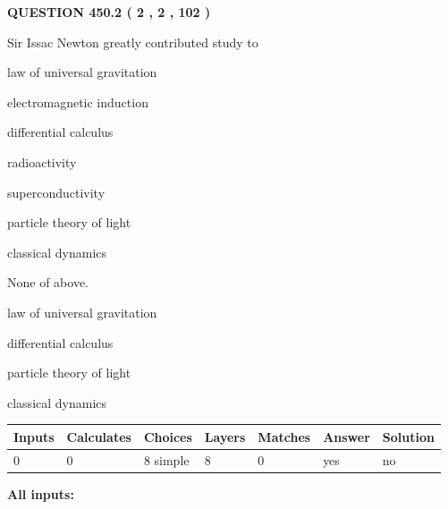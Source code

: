 \documentclass[12pt]{article}
\begin{document}
\vspace{0.2in}
  
{\textbf{\Large{QUESTION
450.2 
 ( 2 , 2 , 102 )
}}}
  
  
Sir Issac Newton greatly contributed study to
 
 
law of universal gravitation
 
 
electromagnetic induction
 
 
differential calculus
 
 
radioactivity
 
 
superconductivity
 
 
particle theory of light
 
 
classical dynamics
 
 
 None of above.
 
 
\noindent{}
 
 
law of universal gravitation
 
 
differential calculus
 
 
particle theory of light
 
 
classical dynamics
 
 
\noindent{}
 
 
   
   
   
   
\noindent\begin{tabular}{|l|l|l|l|l|l|l|}
 \hline
Inputs & Calculates & Choices & Layers & Matches & Answer & Solution \\ \hline
 0  & 
 0  & 
 8
  simple  
  & 
 8  & 
 0  & 
  yes & 
  no 
  \\ \hline
 \end{tabular}
   
   
   
   
\noindent{}
   
   
   
   
\noindent\vspace{0.1in}\hspace{-0.08in} {\textbf{\Large{All inputs: }}}
   
\end{document}
